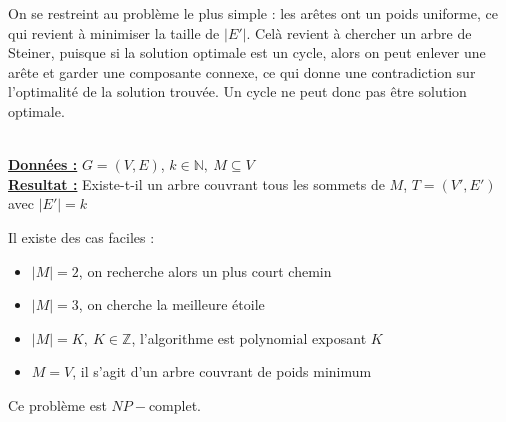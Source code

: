 \documentclass[a4paper,11pt]{thesis}
\begin{document}
On se restreint au problème le plus simple : les arêtes ont un poids uniforme, ce qui revient à
minimiser la taille de $|E'|$. Celà revient à chercher un arbre de Steiner, puisque si la solution
optimale est un cycle, alors on peut enlever une arête et garder une composante connexe, ce qui
donne une contradiction sur l'optimalité de la solution trouvée. Un cycle ne peut donc pas être
solution optimale.

\begin{df}
    ~\\
    \textbf{\underline{Données :}} $G = (V, E)$, $k \in \mathbb{N},\ M \subseteq V$\\
    \textbf{\underline{Resultat :}} Existe-t-il un arbre couvrant tous les sommets de $M$, $T = (V',
    E')$ avec $|E'| = k$
\end{df}

Il existe des cas faciles : 
\begin{itemize}
    \item $|M| = 2$, on recherche alors un plus court chemin
    \item $|M| = 3$, on cherche la meilleure étoile
    \item $|M| = K,\ K \in \mathbb{Z}$, l'algorithme est polynomial exposant $K$
    \item $M = V$, il s'agit d'un arbre couvrant de poids minimum
\end{itemize}

\begin{thrm}
    Ce problème est $NP-$complet.
\end{thrm}
\end{document}
